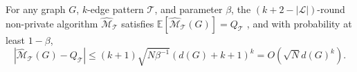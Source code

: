 \begin{lemma}
\label{lem:pattern_sampling_error}
    For any graph $G$, $k$-edge pattern $\mathcal{T}$, and parameter $\beta$, 
the $(k + 2 - |\mathcal{L}|)$-round non-private algorithm $\widehat{\mathcal{M}}_{\mathcal{T}}$ satisfies
$
    \mathbb{E}[\widehat{\mathcal{M}}_\mathcal{T}(G)] = Q_\mathcal{T}
$
, and with probability at least $1 - \beta$,
\begin{equation*}
    |  \widehat{\mathcal{M}}_\mathcal{T}(G)- Q_\mathcal{T}| \leq
    (k+1) \sqrt{N\beta^{-1}}(d(G)+k+1)^k
    = O(\sqrt{N} d(G)^k).
\end{equation*}

\end{lemma}






 
